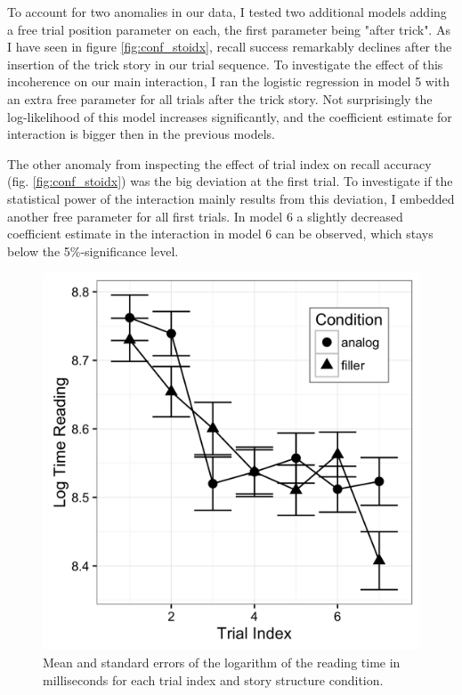 \documentclass[a4paper,man,natbib,floatsintext,import]{apa6}
\begin{document}
\begin{landscape}

\end{landscape}

To account for two anomalies in our data, I tested two additional models adding a free trial position parameter on each, the first parameter being "after trick". As I have seen in figure \ref{fig:conf_stoidx}, recall success remarkably declines after the insertion of the trick story in our trial sequence. To investigate the effect of this incoherence on our main interaction, I ran the logistic regression in model 5 with an extra free parameter for all trials after the trick story. Not surprisingly the log-likelihood of this model increases significantly, and the coefficient estimate for interaction is bigger then in the previous models.

The other anomaly from inspecting the effect of trial index on recall accuracy (fig. \ref{fig:conf_stoidx}) was the big deviation at the first trial. To investigate if the statistical power of the interaction mainly results from this deviation, I embedded another free parameter for all first trials. In model 6 a slightly decreased coefficient estimate in the interaction in model 6 can be observed, which stays below the 5\%-significance level.

\begin{figure}
\centering
\begin{minipage}[t]{.5\textwidth}
\includegraphics[width=.9\linewidth]{figures/read.png}
\caption{Mean and standard errors of the logarithm of the reading time in milliseconds for each trial index and story structure condition.}
\label{fig:read}
\end{minipage}
\end{figure}
\end{document}
